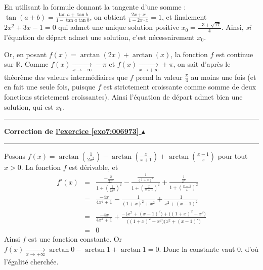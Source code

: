 \documentclass[11pt,a4paper]{article}
\newcommand{\Rr}{\mathbb{R}} \newcommand{\R}{\mathbb{R}}
\newcommand{\Arctan}{\mathop{\mathrm{arctan}}\nolimits}
\newcounter{exo}
\newcommand{\correction}[1]{\hypertarget{cor7:#1}{}\label{cor7:#1}{\bf Correction de \hyperlink{exo7:#1}{l'exercice \ref{exo7:#1} $\blacktriangle$}}\vspace{1mm}\hrule\vspace{1mm}}
\newcommand{\fincorrection}{\vspace{1mm}\hrule\vspace*{7mm}}
\begin{document}
\begin{enumerate}
En utilisant la formule donnant la tangente d'une somme :
$\tan(a+b)=\frac{\tan a +\tan b}{1-\tan a \tan b}$, on obtient $\frac{2x+x}{1-2x\cdot x}=1$, 
et finalement $2x^2+3x-1=0$ qui admet une unique solution positive $x_0=\frac{-3+\sqrt{17}}{4}$. 
Ainsi, {\it si} l'équation de départ admet une solution, c'est nécessairement $x_0$. 

Or, en posant $f(x)=\Arctan(2x)+\Arctan(x)$, la fonction $f$ est continue sur $\Rr$. 
Comme $f(x)\xrightarrow[x\to -\infty]{}-\pi$ et $f(x)\xrightarrow[x\to +\infty]{}+\pi$, 
on sait d'après le théorème des valeurs intermédiaires que $f$ prend la valeur 
$\frac{\pi}{4}$ au moins une fois (et en fait une seule fois, puisque $f$ est 
strictement croissante comme somme de deux fonctions strictement croissantes). 
Ainsi l'équation de départ admet bien une solution, qui est $x_0$.
\end{enumerate}
\fincorrection
\correction{006973}
Posons $f(x)=\Arctan\left(\frac{1}{2x^2}\right)-\Arctan\left(\frac{x}{x+1}\right)+\Arctan\left(\frac{x-1}{x}\right)$ 
pour tout $x>0$. La fonction $f$ est dérivable, et
\begin{eqnarray*}
f'(x)
 &=& \frac{-\frac{2}{2x^3}}{1+\left(\frac{1}{2x^2}\right)^2}-
\frac{\frac{1}{(1+x)^2}}{1+\left( \frac{x}{x+1} \right)^2}
+\frac{\frac{1}{x^2}}{1+\left( \frac{x-1}{x} \right)^2}\\
 &=& \frac{-4x}{4x^4+1}-\frac{1}{(1+x)^2+x^2}+\frac{1}{x^2+(x-1)^2}\\
 &=& \frac{-4x}{4x^4+1}+\frac{-\big(x^2+(x-1)^2\big)+\big((1+x)^2+x^2\big)}{\big((1+x)^2+x^2\big)\big(x^2+(x-1)^2\big)}\\
 &=& 0
\end{eqnarray*}
Ainsi $f$ est une fonction constante. 
Or $f(x)\xrightarrow[x\to +\infty]{}\Arctan 0-\Arctan 1+\Arctan 1=0$. Donc la constante vaut $0$, 
d'où l'égalité cherchée. 
\end{document}
